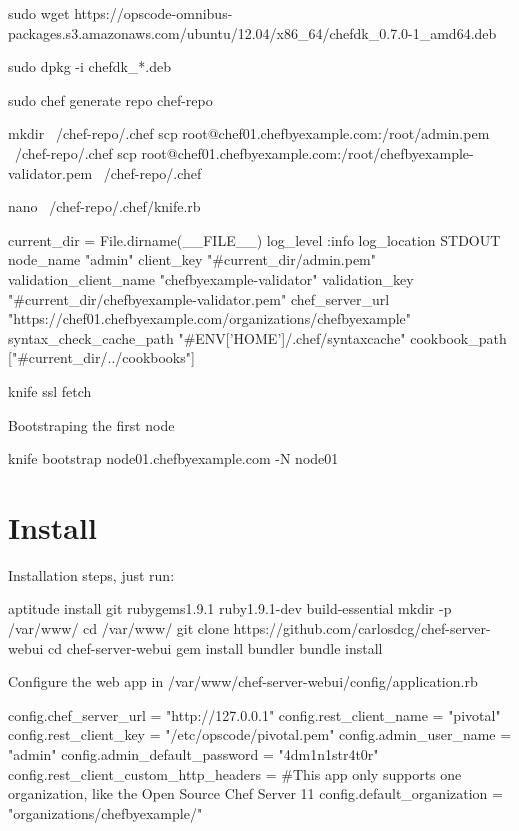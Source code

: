\begin{codelisting}
\label{code:}
\codecaption{}
\begin{code}

sudo wget https://opscode-omnibus-packages.s3.amazonaws.com/ubuntu/12.04/x86_64/chefdk_0.7.0-1_amd64.deb

sudo dpkg -i chefdk_*.deb

sudo chef generate repo chef-repo

mkdir ~/chef-repo/.chef
scp root@chef01.chefbyexample.com:/root/admin.pem ~/chef-repo/.chef
scp root@chef01.chefbyexample.com:/root/chefbyexample-validator.pem ~/chef-repo/.chef

nano ~/chef-repo/.chef/knife.rb


current_dir = File.dirname(__FILE__)
log_level                :info
log_location             STDOUT
node_name                "admin"
client_key               "#{current_dir}/admin.pem"
validation_client_name   "chefbyexample-validator"
validation_key           "#{current_dir}/chefbyexample-validator.pem"
chef_server_url          "https://chef01.chefbyexample.com/organizations/chefbyexample"
syntax_check_cache_path  "#{ENV['HOME']}/.chef/syntaxcache"
cookbook_path            ["#{current_dir}/../cookbooks"]


knife ssl fetch

Bootstraping the first node

knife bootstrap node01.chefbyexample.com -N node01


\end{code}
\end{codelisting}

\section{Install}

Installation steps, just run:
\begin{codelisting}
\label{code:}
\codecaption{}
\begin{code}
aptitude install git rubygems1.9.1 ruby1.9.1-dev build-essential
mkdir -p /var/www/
cd /var/www/
git clone https://github.com/carlosdcg/chef-server-webui
cd chef-server-webui
gem install bundler
bundle install
\end{code}
\end{codelisting}

Configure the web app in /var/www/chef-server-webui/config/application.rb

\begin{codelisting}
\label{code:}
\codecaption{}
\begin{code}
config.chef_server_url = "http://127.0.0.1"
config.rest_client_name = "pivotal"
config.rest_client_key = "/etc/opscode/pivotal.pem"
config.admin_user_name =  "admin"
config.admin_default_password = "4dm1n1str4t0r"
config.rest_client_custom_http_headers = {}
#This app only supports one organization, like the Open Source Chef Server 11
config.default_organization = "organizations/chefbyexample/"
\end{code}
\end{codelisting}

